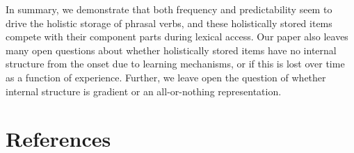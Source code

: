 \documentclass[
  man,floatsintext]{apa6}
\begin{document}
In summary, we demonstrate that both frequency and predictability seem to drive the holistic storage of phrasal verbs, and these holistically stored items compete with their component parts during lexical access. Our paper also leaves many open questions about whether holistically stored items have no internal structure from the onset due to learning mechanisms, or if this is lost over time as a function of experience. Further, we leave open the question of whether internal structure is gradient or an all-or-nothing representation.

\newpage

\section{References}\label{references}
\end{document}
